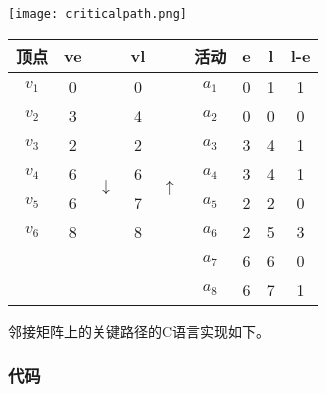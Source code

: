 \begin{center}
\texttt{[image: criticalpath.png]}\\
\label{fig:criticalpath}
\end{center}

\begin{center}
\label{tab:criticalpath}
\begin{tabular}{|ccccc|cccc|}
\hline
\textbf{顶点} & \textbf{ve} & & \textbf{vl} & & \textbf{活动} & \textbf{e} & \textbf{l} & \textbf{l-e} \\
\hline
$v_1$ & 0 & \multirow{8}{*}{$\downarrow$} & 0 & \multirow{8}{*}{$\uparrow$} & $a_1$ & 0 & 1 & 1 \\
$v_2$ & 3 &                               & 4 &                             & $a_2$ & 0 & 0 & 0 \\
$v_3$ & 2 &                               & 2 &                             & $a_3$ & 3 & 4 & 1 \\
$v_4$ & 6 &                               & 6 &                             & $a_4$ & 3 & 4 & 1 \\
$v_5$ & 6 &                               & 7 &                             & $a_5$ & 2 & 2 & 0 \\
$v_6$ & 8 &                               & 8 &                             & $a_6$ & 2 & 5 & 3 \\
      &   &                               &   &                             & $a_7$ & 6 & 6 & 0 \\
      &   &                               &   &                             & $a_8$ & 6 & 7 & 1 \\
\hline
\end{tabular}
\end{center}


邻接矩阵上的关键路径的C语言实现如下。

\subsubsection{代码}

